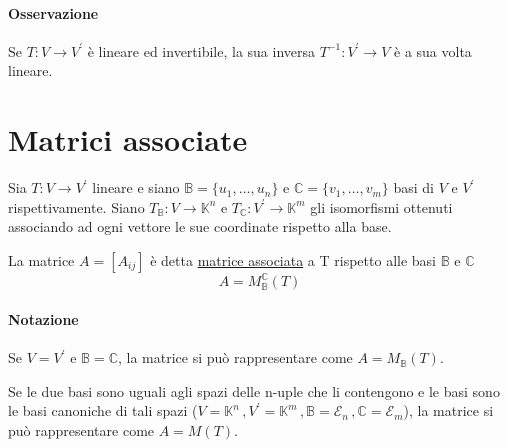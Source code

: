 		\paragraph{Osservazione} Se  $T: V \rightarrow V^\prime$  è lineare ed invertibile, la sua inversa  $T^{-1}: V^\prime \rightarrow V$ è a sua volta lineare.
	\section{Matrici associate}
		Sia $T: V \rightarrow V^\prime$ lineare e siano $\mathbb{B} = \{ u_1, \dots, u_n \}$ e $\mathbb{C} = \{ v_1, \dots, v_m \}$ basi di $V$ e $V^\prime$ rispettivamente. Siano $T_\mathbb{B}: V \rightarrow \mathbb{K}^n$ e $T_\mathbb{C}: V^\prime \rightarrow \mathbb{K}^m$ gli isomorfismi ottenuti associando ad ogni vettore le sue coordinate rispetto alla base.
		
		La matrice $A=[A_{ij}]$ è detta \underline{matrice associata} a T rispetto alle basi $\mathbb{B}$ e $\mathbb{C}$
		$$A = M_\mathbb{B}^\mathbb{C} (T)$$
		
		\paragraph{Notazione} Se $V = V^\prime$ e $\mathbb{B} = \mathbb{C}$, la matrice si può rappresentare come $A = M_\mathbb{B} (T)$.
		
		Se le due basi sono uguali agli spazi delle n-uple che li contengono e le basi sono le basi canoniche di tali spazi ($V=\mathbb{K}^n \, , V^\prime=\mathbb{K}^m \, , \mathbb{B}=\mathcal{E}_n \, , \mathbb{C}=\mathcal{E}_m$), la matrice si può rappresentare come $A = M(T)$.